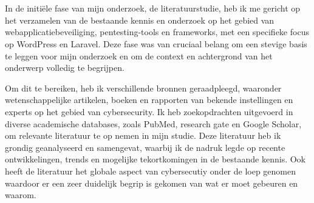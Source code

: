
\chapter{}%
\label{ch:methodologie}

In de initiële fase van mijn onderzoek, de literatuurstudie, heb ik me gericht op het verzamelen van de bestaande 
kennis en onderzoek op het gebied van webapplicatiebeveiliging, 
pentesting-tools en frameworks, met een specifieke focus op WordPress en Laravel. Deze fase was van cruciaal 
belang om een stevige basis te leggen voor mijn onderzoek en om de context en achtergrond van het onderwerp volledig te 
begrijpen.

Om dit te bereiken, heb ik verschillende bronnen geraadpleegd, waaronder wetenschappelijke artikelen, boeken  
en rapporten van bekende instellingen en experts op het gebied van cybersecurity. 
Ik heb zoekopdrachten uitgevoerd in diverse academische databases, zoals PubMed, research gate en 
Google Scholar, om relevante literatuur te op nemen in mijn studie. Deze literatuur heb ik grondig geanalyseerd en 
samengevat, waarbij ik de nadruk legde op recente ontwikkelingen, trends en mogelijke tekortkomingen in de bestaande kennis.
Ook heeft de literatuur het globale aspect van cybersecutiy onder de loep genomen waardoor er een zeer duidelijk begrip is gekomen 
van wat er moet gebeuren en waarom.


